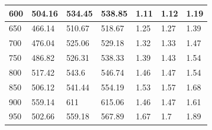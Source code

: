 \begin{table}[H]
\begin{tabular}{|l|l|l|l|l|l|l|}
600              & 504.16               & 534.45               & 538.85               & 1.11              & 1.12              & 1.19              \\ \hline
650              & 466.14               & 510.67               & 518.67               & 1.25              & 1.27              & 1.39              \\ \hline
700              & 476.04               & 525.06               & 529.18               & 1.32              & 1.33              & 1.47              \\ \hline
750              & 486.82               & 526.31               & 538.33               & 1.39              & 1.43              & 1.54              \\ \hline
800              & 517.42               & 543.6                & 546.74               & 1.46              & 1.47              & 1.54              \\ \hline
850              & 506.12               & 541.44               & 554.19               & 1.53              & 1.57              & 1.68              \\ \hline
900              & 559.14               & 611                  & 615.06               & 1.46              & 1.47              & 1.61              \\ \hline
950              & 502.66               & 559.18               & 567.89               & 1.67              & 1.7               & 1.89              \\ \hline
\end{tabular}
\end{table}



